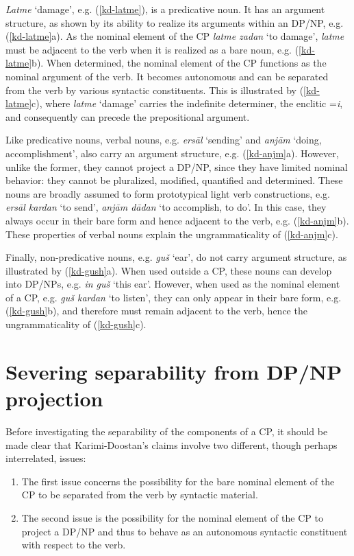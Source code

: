 \documentclass[output=paper]{langsci/langscibook}
\begin{document}
\textit{Latme} `damage', e.g. (\ref{kd-latme}), is a predicative noun. It has an argument structure, as shown by its ability to realize its arguments within an DP/NP, e.g. (\ref{kd-latme}a). As the nominal element of the CP \textit{latme zadan} `to damage', \textit{latme} must be adjacent to the verb when it is realized as a bare noun, e.g. (\ref{kd-latme}b). When determined, the nominal element of the CP functions as the nominal argument of the verb. It becomes autonomous and can be separated from the verb by various syntactic constituents. This is illustrated by (\ref{kd-latme}c),  where \textit{latme} `damage' carries the indefinite determiner, the enclitic =\textit{i}, and consequently can precede the prepositional argument.



Like predicative nouns, verbal nouns, e.g. \textit{ers\=al} `sending' and \textit{anj\=am} `doing, accomplishment', also carry an argument structure, e.g. (\ref{kd-anjm}a). However, unlike the former, they cannot project a DP/NP, since they have limited nominal behavior: they cannot be pluralized, modified, quantified and determined.  
These nouns are broadly assumed to form prototypical light verb constructions, e.g. \textit{ers\=al kardan} `to send', \textit{anj\=am d\=adan} `to accomplish, to do'. In this case, they always occur in their bare form and hence adjacent to the verb, e.g. (\ref{kd-anjm}b). These properties of verbal nouns explain the ungrammaticality of (\ref{kd-anjm}c).

Finally, non-predicative nouns, e.g. \textit{gu\v{s}} `ear', do not carry argument structure, as illustrated by (\ref{kd-gush}a). When used outside a CP, these nouns can develop into DP/NPs, e.g. \textit{in gu\v{s}} `this ear'. However, when used as the nominal element of a CP, e.g. \textit{gu\v{s} kardan} `to listen', they can only appear in their bare form, e.g. (\ref{kd-gush}b), and therefore must remain adjacent to the verb, hence the ungrammaticality of (\ref{kd-gush}c).


\section{Severing separability from DP/NP projection}\label{Sec:Severing}

Before investigating the separability of the components of a CP, it should be made clear that Karimi-Doostan's claims involve two different, though perhaps interrelated, issues:

\begin{enumerate}\label{claim-2}
	\item The first issue concerns the possibility for the bare nominal element of the CP to be separated from the verb by syntactic material. 
	\item
          \begin{sloppypar}
            The second issue is the possibility for the nominal
            element of the CP to project a DP/NP and thus to behave as
            an autonomous syntactic constituent with respect to the
            verb.
          \end{sloppypar}

\end{enumerate}
\end{document}
